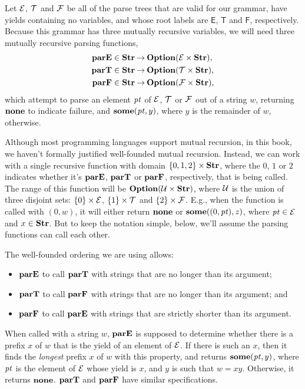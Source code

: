 Let $\cal E$, $\cal T$ and $\cal F$ be all of the parse trees that
are valid for our grammar, have yields containing no variables,
and whose root labels are $\mathsf{E}$, $\mathsf{T}$ and $\mathsf{F}$, 
respectively.
Because this grammar has three mutually recursive variables, we
will need three mutually recursive parsing functions,
\begin{align*}
\mathbf{parE} &\in \mathbf{Str}\mathbin{\to}\mathbf{Option}({\cal E}\times\mathbf{Str}) , \\
\mathbf{parT} &\in \mathbf{Str}\mathbin{\to}\mathbf{Option}({\cal T}\times\mathbf{Str}) , \\
\mathbf{parF} &\in \mathbf{Str}\mathbin{\to}\mathbf{Option}({\cal F}\times\mathbf{Str}) ,
\end{align*}
which attempt to parse an element ${\it pt}$ of $\cal E$, $\cal T$ or $\cal
F$ out of a string $w$, returning $\mathbf{none}$ to indicate failure, and
$\mathbf{some}({\it pt},y)$, where $y$ is the remainder of $w$, otherwise.

Although most programming languages support mutual recursion, in this
book, we haven't formally justified well-founded mutual recursion.
Instead, we can work with a single recursive function with domain
$\{0,1,2\}\times\mathbf{Str}$, where the $0$, $1$ or $2$ indicates whether
it's $\mathbf{parE}$, $\mathbf{parT}$ or $\mathbf{parF}$, respectively, that is being called.
The range of this function will be $\mathbf{Option}({\cal U}\times\mathbf{Str})$,
where $\cal U$ is the union of three disjoint sets:
$\{0\}\times{\cal E}$, $\{1\}\times{\cal T}$ and
$\{2\}\times{\cal F}$. E.g., when the function is called with $(0,w)$,
it will either return $\mathbf{none}$ or $\mathbf{some}((0,{\it pt}), z)$, where
${\it pt}\in\cal E$ and $x\in\mathbf{Str}$. But to keep the notation simple, below,
we'll assume the parsing functions can call each other.

The well-founded ordering we are using allows:
\begin{itemize}
\item $\mathbf{parE}$ to call $\mathbf{parT}$ with strings that are no longer
  than its argument;

\item $\mathbf{parT}$ to call $\mathbf{parF}$ with strings that are no longer
  than its argument; and

\item $\mathbf{parF}$ to call $\mathbf{parE}$ with strings that are strictly shorter
  than its argument.
\end{itemize}

When called with a string $w$, $\mathbf{parE}$ is supposed to
determine whether there is a prefix $x$ of $w$ that is the
yield of an element of $\cal E$.  If there is such an $x$,
then it finds the \emph{longest} prefix $x$ of $w$ with this
property, and returns $\mathbf{some}({\it pt},y)$, where ${\it pt}$ is the
element of $\cal E$ whose yield is $x$, and $y$ is such
that $w=xy$.  Otherwise, it returns $\mathbf{none}$.
$\mathbf{parT}$ and $\mathbf{parF}$ have similar specifications.

